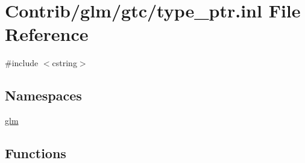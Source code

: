 \hypertarget{type__ptr_8inl}{}\section{Contrib/glm/gtc/type\+\_\+ptr.inl File Reference}
\label{type__ptr_8inl}
{\ttfamily \#include $<$cstring$>$}\newline
\subsection*{Namespaces}
\begin{DoxyCompactItemize}
\item 
 \mbox{\hyperlink{namespaceglm}{glm}}
\end{DoxyCompactItemize}
\subsection*{Functions}
